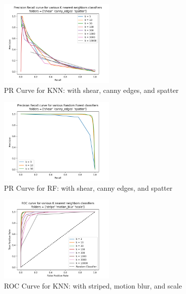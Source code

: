 \begin{figure}[htbp]
    \centerline{\includegraphics[width=0.5\textwidth]{resources/precision_recall_knn_shear_canny_edges_spatter.png}}    
    \caption{PR Curve for KNN: with shear, canny edges, and spatter}\label{fig15}
\end{figure}

\begin{figure}[htbp]
    \centerline{\includegraphics[width=0.5\textwidth]{resources/precision_recall_rf_shear_canny_edges_spatter.png}}    
    \caption{PR Curve for RF: with shear, canny edges, and spatter}\label{fig16}
\end{figure}

\begin{figure}[htbp]
    \centerline{\includegraphics[width=0.5\textwidth]{resources/roc_curve_knn_stripe_motion_blur_scale.png}}    
    \caption{ROC Curve for KNN: with striped, motion blur, and scale}\label{fig17}
\end{figure}

